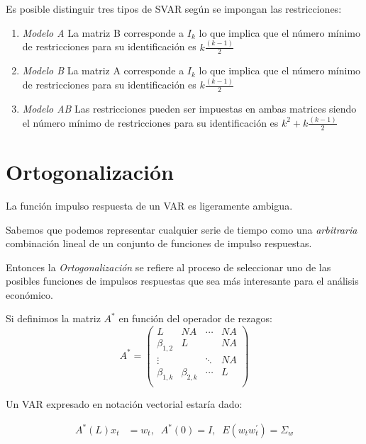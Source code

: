 \documentclass[
]{book}
\begin{document}
Es posible distinguir tres tipos de SVAR según se impongan las restricciones:

\begin{enumerate}
\def\labelenumi{\arabic{enumi}.}
\item
  \emph{Modelo A} La matriz B corresponde a \(I_{k}\) lo que implica que el número mínimo de restricciones para su identificación es \(k\frac{(k-1)}{2}\)
\item
  \emph{Modelo B} La matriz A corresponde a \(I_{k}\) lo que implica que el número mínimo de restricciones para su identificación es \(k\frac{(k-1)}{2}\)
\item
  \emph{Modelo AB} Las restricciones pueden ser impuestas en ambas matrices siendo el número mínimo de restricciones para su identificación es \(k^{2}+k\frac{(k-1)}{2}\)
\end{enumerate}

\hypertarget{ortogonalizaciuxf3n}{%
\section{Ortogonalización}\label{ortogonalizaciuxf3n}}

La función impulso respuesta de un VAR es ligeramente ambigua.

Sabemos que podemos representar cualquier serie de tiempo como una \emph{arbitraria} combinación lineal de un conjunto de funciones de impulso respuestas.

Entonces la \emph{Ortogonalización} se refiere al proceso de seleccionar uno de las posibles funciones de impulsos respuestas que sea más interesante para el análisis económico.

Si definimos la matriz \(A^{*}\) en función del operador de rezagos:
\begin{equation}
A^{*}=\left( \begin{array}{cccc}
L      & NA  & \cdots & NA\\
\beta_{1,2} & L   &        & NA\\
\vdots &     & \ddots & NA\\
\beta_{1,k} & \beta_{2,k}   & \cdots & L\\
\end{array}
\right)
\end{equation}

Un VAR expresado en notación vectorial estaría dado:

\begin{align}
A^{*}(L)x_{t}&=w_{t},\;\;A^{*}(0)=I,\;\;E(w_{t}w_{t}^{'})=\Sigma_w 
\end{align}
\end{document}
